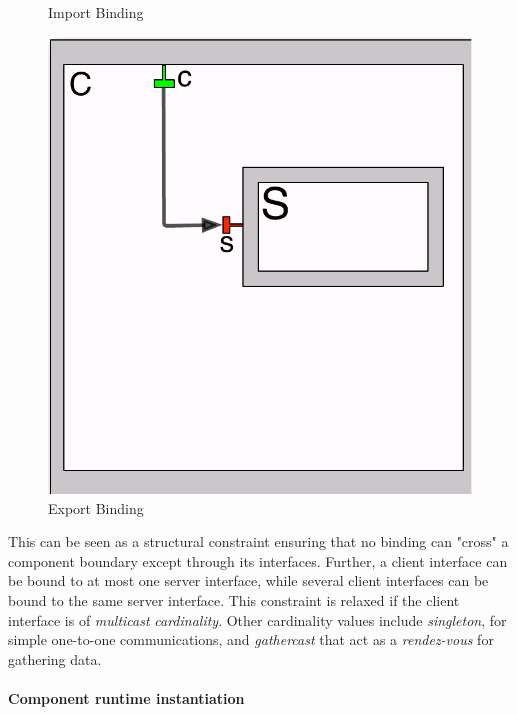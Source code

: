 \begin{figure}[H]
\begin{minipage}[b]{0.3\linewidth}
	\caption{Import Binding}
	\label{fig:import}
	\end{minipage}
	\hspace{0.25cm}
	\begin{minipage}[b]{0.3\linewidth}
	\centering
	\includegraphics[width=\textwidth]{figures/chapter2/exportbinding.pdf}
	\caption{Export Binding}
	\label{fig:export}
	\end{minipage}
	\end{figure}	  		
	
	
	\noindent This can be seen as a structural constraint ensuring that no binding can "cross" a
	component boundary except through its interfaces. Further, a client interface
	can be bound to at most one server interface, while several client interfaces can be bound to the
	same server interface. This constraint is relaxed if the client interface is of \textit{multicast} 
	\textit{cardinality}. Other cardinality values include \textit{singleton}, for simple one-to-one
	communications, and \textit{gathercast} that act as a \textit{rendez-vous} for gathering data.
		
	
	\paragraph{Component runtime instantiation}
		
